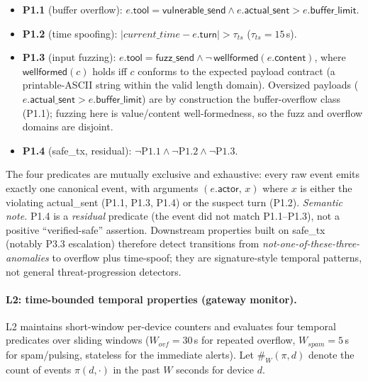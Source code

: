 \documentclass[runningheads]{llncs}
\begin{document}
\begin{itemize}\setlength{\itemsep}{1pt}
\item \textbf{P1.1} (buffer overflow):
$e.\mathsf{tool} = \textsf{vulnerable\_send} \wedge
e.\mathsf{actual\_sent} > e.\mathsf{buffer\_limit}$.
\item \textbf{P1.2} (time spoofing):
$|\mathit{current\_time} - e.\mathsf{turn}| > \tau_{ts}$
($\tau_{ts}{=}15$\,s).
\item \textbf{P1.3} (input fuzzing):
$e.\mathsf{tool} = \mathsf{fuzz\_send} \wedge \neg\,\mathsf{wellformed}(e.\mathsf{content})$,
where $\mathsf{wellformed}(c)$ holds iff $c$ conforms to the expected payload
contract (a printable-ASCII string within the valid length domain). Oversized payloads ($e.\textsf{actual\_sent} > e.\textsf{buffer\_limit}$) are by construction the buffer-overflow class (P1.1); fuzzing here is value/content well-formedness, so the fuzz and overflow domains are disjoint.
\item \textbf{P1.4} (\textsf{safe\_tx}, residual):
$\neg\mathrm{P1.1} \wedge \neg\mathrm{P1.2} \wedge \neg\mathrm{P1.3}$.
\end{itemize}
\noindent
The four predicates are mutually exclusive and exhaustive: every
raw event emits exactly one canonical event, with arguments
$(e.\mathsf{actor},\, x)$ where $x$ is either the violating
\textsf{actual\_sent} (P1.1, P1.3, P1.4) or the suspect
\textsf{turn} (P1.2).  \emph{Semantic note.}  P1.4 is a
\emph{residual} predicate (the event did not match P1.1--P1.3),
not a positive ``verified-safe'' assertion.  Downstream
properties built on \textsf{safe\_tx} (notably P3.3 escalation)
therefore detect transitions from \emph{not-one-of-these-three-anomalies}
to overflow plus time-spoof; they are signature-style temporal
patterns, not general threat-progression detectors.

\paragraph{L2: time-bounded temporal properties (gateway monitor).}
\label{sec:spec:l2}
L2 maintains short-window per-device counters and evaluates
four temporal predicates over sliding windows
($W_{\mathit{ovf}}{=}30$\,s for repeated overflow,
$W_{\mathit{spam}}{=}5$\,s for spam/pulsing, stateless for the
immediate alerts).  Let $\#_W(\pi, d)$ denote the
count of events $\pi(d,\cdot)$ in the past $W$ seconds for device
$d$.
\end{document}
